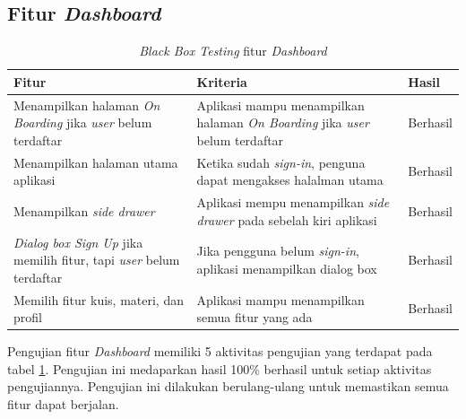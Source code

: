 \subsection{Fitur \textit{Dashboard}}
\begin{table}[H]
	\centering
	\caption{\textit{Black Box Testing} fitur \textit{Dashboard}}
	\label{Tab:blackBoxDash}
	\begin{tabular}{|p{}|p{}|p{}|}
		\hline
		 \centering\textbf{Fitur} & \multicolumn{1}{m{0.45\textwidth}|}{\centering \textbf{Kriteria}}&  \multicolumn{1}{m{0.1\textwidth}|}{\centering \textbf{Hasil}}\\
		\hline
		Menampilkan halaman \textit{On Boarding} jika \textit{user} belum terdaftar 
		& Aplikasi mampu menampilkan halaman \textit{On Boarding} jika \textit{user} belum terdaftar  
		& Berhasil\\
		\hline
		Menampilkan halaman utama aplikasi
		& Ketika sudah \textit{sign-in}, penguna dapat mengakses halalman utama 
		& Berhasil\\
		\hline
		Menampilkan \textit{side drawer}
		& Aplikasi mempu menampilkan \textit{side drawer} pada sebelah kiri aplikasi
		& Berhasil\\
		\hline
		\textit{Dialog box Sign Up} jika memilih fitur, tapi \textit{user} belum terdaftar
		& Jika pengguna belum \textit{sign-in}, aplikasi menampilkan dialog box 
		& Berhasil\\
		\hline
		Memilih fitur kuis, materi, dan profil
		& Aplikasi mampu menampilkan semua fitur yang ada
		& Berhasil\\
		\hline
	\end{tabular}
\end{table}
Pengujian fitur \textit{Dashboard} memiliki 5 aktivitas pengujian yang terdapat pada tabel \ref*{Tab:blackBoxDash}.
Pengujian ini medaparkan hasil 100\% berhasil untuk setiap aktivitas pengujiannya. Pengujian ini dilakukan berulang-ulang untuk memastikan semua fitur dapat berjalan.
